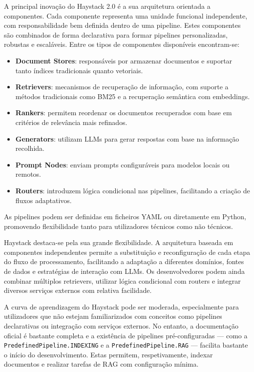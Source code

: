 A principal inovação do Haystack 2.0 é a sua arquitetura orientada a componentes. Cada componente representa uma unidade funcional independente, com responsabilidade bem definida dentro de uma pipeline. Estes componentes são combinados de forma declarativa para formar pipelines personalizadas, robustas e escaláveis. Entre os tipos de componentes disponíveis encontram-se:

\begin{itemize} \item \textbf{Document Stores}: responsáveis por armazenar documentos e suportar tanto índices tradicionais quanto vetoriais. \item \textbf{Retrievers}: mecanismos de recuperação de informação, com suporte a métodos tradicionais como BM25 e a recuperação semântica com embeddings. \item \textbf{Rankers}: permitem reordenar os documentos recuperados com base em critérios de relevância mais refinados. \item \textbf{Generators}: utilizam LLMs para gerar respostas com base na informação recolhida. \item \textbf{Prompt Nodes}: enviam prompts configuráveis para modelos locais ou remotos. \item \textbf{Routers}: introduzem lógica condicional nas pipelines, facilitando a criação de fluxos adaptativos. \end{itemize}

As pipelines podem ser definidas em ficheiros YAML ou diretamente em Python, promovendo flexibilidade tanto para utilizadores técnicos como não técnicos.


Haystack destaca-se pela sua grande flexibilidade. A arquitetura baseada em componentes independentes permite a substituição e reconfiguração de cada etapa do fluxo de processamento, facilitando a adaptação a diferentes domínios, fontes de dados e estratégias de interação com LLMs. Os desenvolvedores podem ainda combinar múltiplos retrievers, utilizar lógica condicional com routers e integrar diversos serviços externos com relativa facilidade.



A curva de aprendizagem do Haystack pode ser moderada, especialmente para utilizadores que não estejam familiarizados com conceitos como pipelines declarativas ou integração com serviços externos. No entanto, a documentação oficial é bastante completa e a existência de pipelines pré-configuradas — como a \texttt{PredefinedPipeline.INDEXING} e a \texttt{PredefinedPipeline.RAG} — facilita bastante o início do desenvolvimento. Estas permitem, respetivamente, indexar documentos e realizar tarefas de RAG com configuração mínima.


